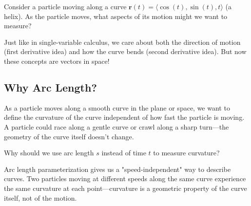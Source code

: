 \documentclass{ximera}
\begin{document}
\begin{problem}
Consider a particle moving along a curve $\mathbf{r}(t) = \langle \cos(t), \sin(t), t \rangle$ (a helix). As the particle moves, what aspects of its motion might we want to measure?

\begin{selectAll}
\end{selectAll}

\begin{feedback}
Just like in single-variable calculus, we care about both the direction of motion (first derivative idea) and how the curve bends (second derivative idea). But now these concepts are vectors in space!
\end{feedback}
\end{problem}

\subsection*{Why Arc Length?}

As a particle moves along a smooth curve in the plane or space, we want to define the curvature of the curve independent of how fast the particle is moving. A particle could race along a gentle curve or crawl along a sharp turn—the geometry of the curve itself doesn't change.

\begin{problem}
Why should we use arc length $s$ instead of time $t$ to measure curvature?

\begin{multipleChoice}
\end{multipleChoice}

\begin{feedback}
Arc length parameterization gives us a "speed-independent" way to describe curves. Two particles moving at different speeds along the same curve experience the same curvature at each point—curvature is a geometric property of the curve itself, not of the motion.
\end{feedback}
\end{problem}
\end{document}
